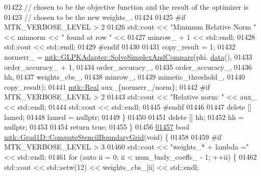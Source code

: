 \begin{DoxyCode}
{{01422     \textcolor{comment}{// chosen to be the objective function and the result of the optimizer is}
01423     \textcolor{comment}{// chosen to be the new weights\_.}
01424 
01425 \textcolor{preprocessor}{    #if MTK\_VERBOSE\_LEVEL > 2}
01426     std::cout << \textcolor{stringliteral}{"Minimum Relative Norm "} << minnorm << \textcolor{stringliteral}{" found at row "} <<
01427       minrow\_ + 1 << std::endl;
01428     std::cout << std::endl;
01429 \textcolor{preprocessor}{    #endif}
01430 
01431     copy\_result = 1;
01432     normerr\_ = \hyperlink{classmtk_1_1GLPKAdapter_a834480aca83e3c0d09fdab7fdb7e8a3f}{mtk::GLPKAdapter::SolveSimplexAndCompare}(phi.
      \hyperlink{classmtk_1_1DenseMatrix_a0c33b8a9e01d157c61ddbdf807c25d84}{data}(),
01433                                                         order\_accuracy\_ + 1,
01434                                                         order\_accuracy\_,
01435                                                         order\_accuracy\_,
01436                                                         hh,
01437                                                         weights\_cbs\_,
01438                                                         minrow\_,
01439                                                         mimetic\_threshold\_,
01440                                                         copy\_result);
01441     \hyperlink{group__c01-roots_gac080bbbf5cbb5502c9f00405f894857d}{mtk::Real} aux\_\{normerr\_/norm\};
01442 \textcolor{preprocessor}{    #if MTK\_VERBOSE\_LEVEL > 2}
01443     std::cout << \textcolor{stringliteral}{"Relative norm: "} << aux\_ << std::endl;
01444     std::cout << std::endl;
01445 \textcolor{preprocessor}{    #endif}
01446 
01447     \textcolor{keyword}{delete} [] lamed;
01448     lamed = \textcolor{keyword}{nullptr};
01449   \}
01450 
01451   \textcolor{keyword}{delete} [] hh;
01452   hh = \textcolor{keyword}{nullptr};
01453 
01454   \textcolor{keywordflow}{return} \textcolor{keyword}{true};
01455 \}
01456 
\hypertarget{mtk__grad__1d_8cc_source_l01457}{}\hyperlink{classmtk_1_1Grad1D_a7ad1cecf6b52647263208ffaea0ee1e5}{01457} \textcolor{keywordtype}{bool} \hyperlink{classmtk_1_1Grad1D_a7ad1cecf6b52647263208ffaea0ee1e5}{mtk::Grad1D::ComputeStencilBoundaryGrid}(\textcolor{keywordtype}{void}) \{
01458 
01459 \textcolor{preprocessor}{  #if MTK\_VERBOSE\_LEVEL > 3}
01460   std::cout << \textcolor{stringliteral}{"weights\_* + lambda ="} << std::endl;
01461   \textcolor{keywordflow}{for} (\textcolor{keyword}{auto} ii = 0; ii < num\_bndy\_coeffs\_ - 1; ++ii) \{
01462     std::cout << std::setw(12) << weights\_cbs\_[ii] << std::endl;
}}
\end{DoxyCode}
